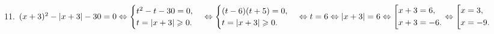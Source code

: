 11. $(x+3)^2-|x+3|-30=0\Leftrightarrow \begin{cases}
t^2-t-30=0,\\
t=|x+3|\geqslant0.\end{cases}\Leftrightarrow \begin{cases}
(t-6)(t+5)=0,\\
t=|x+3|\geqslant0.\end{cases}\Leftrightarrow t=6 \Leftrightarrow |x+3|=6 \Leftrightarrow \left[
\begin{gathered}
x+3=6, \hfill
\\
x+3=-6. \hfill
\\
\end{gathered}
\right.\Leftrightarrow\left[
\begin{gathered}
x=3, \hfill
\\
x=-9. \hfill
\\
\end{gathered}
\right.$\\
